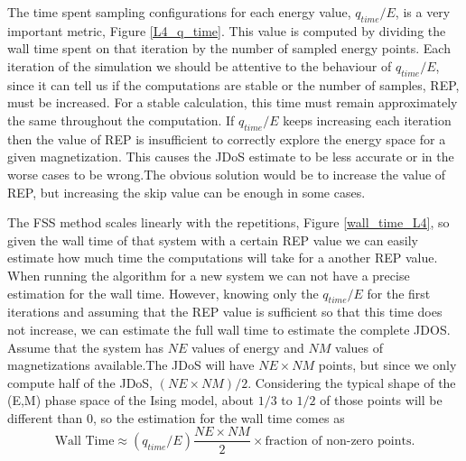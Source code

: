 	The time spent sampling configurations for each energy value, $q_{time}/E$, is a very important metric, Figure \ref{L4_q_time}. This value is computed by dividing the wall time spent on that iteration by the number of sampled energy points. Each iteration of the simulation we should be attentive to the behaviour of $q_{time}/E$, since it can tell us if the computations are stable or the number of samples, REP, must be increased. 
For a stable calculation, this time must remain approximately the same throughout the computation. If $q_{time}/E$ keeps increasing each iteration then the value of REP is insufficient to correctly explore the energy space for a given magnetization. This causes the JDoS estimate to be less accurate or in the worse cases to be wrong.The obvious solution would be to increase the value of REP, but increasing the skip value can be enough in some cases.

	The FSS method scales linearly with the repetitions, Figure \ref{wall_time_L4}, so given the wall time of that system with a certain REP value we can easily estimate how much time the computations will take for a another REP value.
When running the algorithm for a new system we can not have a precise estimation for the wall time. However, knowing only the $q_{time}/E$ for the first iterations and assuming that the REP value is sufficient so that this time does not increase, we can estimate the full wall time to estimate the complete JDOS. Assume that the system has $NE$ values of energy and $NM$ values of magnetizations available.The JDoS will have $NE \times NM$ points, but since we only compute half of the JDoS, $( NE \times NM ) / 2$. Considering the typical shape of the (E,M) phase space of the Ising model, about $1/3$ to $1/2$ of those points will be different than 0, so the estimation for the wall time comes as 
\begin{equation}\label{estimation}
	\text{Wall Time} \approx (q_{time}/E) \frac{NE \times NM}{2} \times \text{fraction of non-zero points} .
\end{equation}

\pagebreak

